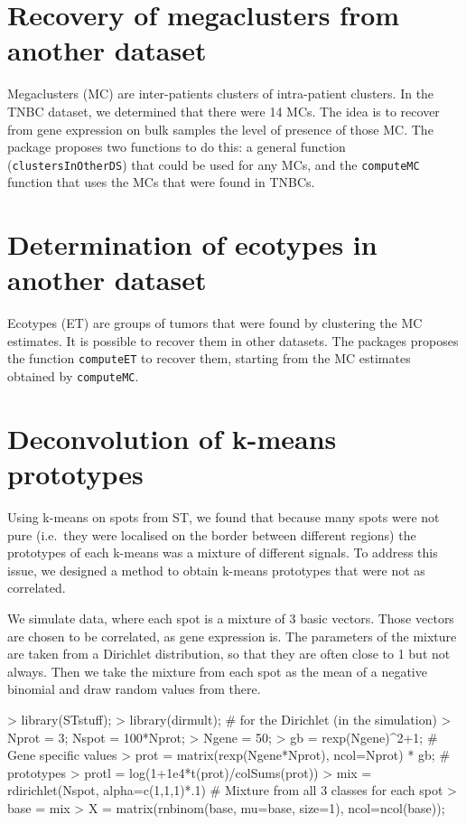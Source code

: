 \documentclass{article}
\begin{document}
\section{Recovery of megaclusters from another dataset}
Megaclusters (MC) are inter-patients clusters of intra-patient clusters.
In the TNBC dataset, we determined that there were 14 MCs.
The idea is to recover from gene expression on bulk samples the level of presence of those MC.
The package proposes two functions to do this: a general function (\verb!clustersInOtherDS!) that could be used for any MCs, and the \verb!computeMC! function that uses the MCs that were found in TNBCs.

\section{Determination of ecotypes in another dataset}
Ecotypes (ET) are groups of tumors that were found by clustering the MC estimates.
It is possible to recover them in other datasets. The packages proposes the function \verb!computeET! to recover them, starting from the MC estimates obtained by \verb!computeMC!.

\section{Deconvolution of k-means prototypes}
Using k-means on spots from ST, we found that because many spots were not pure (i.e.\ they were localised on the border between different regions) the prototypes of each k-means was a mixture of different signals.
To address this issue, we designed a method to obtain k-means prototypes that were not as correlated. 

We simulate data, where each spot is a mixture of 3 basic vectors.
Those vectors are chosen to be correlated, as gene expression is.
The parameters of the mixture are taken from a Dirichlet distribution, so that they are often close to 1 but not always.
Then we take the mixture from each spot as the mean of a negative binomial and draw random values from there.
  
\begin{Schunk}
\begin{Sinput}
> library(STstuff);
> library(dirmult); # for the Dirichlet (in the simulation)
> Nprot = 3; Nspot = 100*Nprot;
> Ngene = 50;
> gb = rexp(Ngene)^2+1; # Gene specific values
> prot = matrix(rexp(Ngene*Nprot), ncol=Nprot) * gb; # prototypes
> protl = log(1+1e4*t(prot)/colSums(prot))
> mix = rdirichlet(Nspot, alpha=c(1,1,1)*.1) # Mixture from all 3 classes for each spot
> base = mix %*% t(prot)
> X = matrix(rnbinom(base, mu=base, size=1), ncol=ncol(base));
\end{Sinput}
\end{Schunk}
\end{document}
